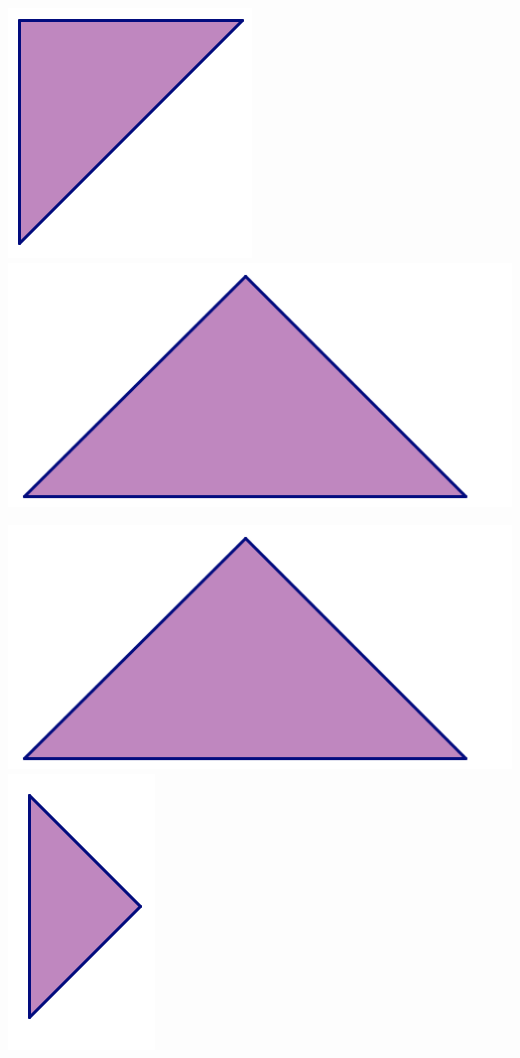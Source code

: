 \begin{center}
\includegraphics[scale = .470]{medtri}
\hfill
\includegraphics[scale = .470]{bigtri}

\bigskip
\bigskip


\includegraphics[scale = .470]{bigtri}
\hfill
\includegraphics[scale = .470]{smtri}
\end{center}

